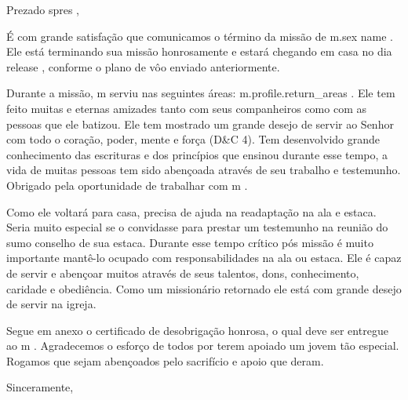 \documentclass[12pt]{letter}
\begin{document}
\begin{letter}{Prezado {{ spres }},}

\date{ {{ date }} }
\opening{}

É com grande satisfação que comunicamos o término da missão de {{ m.sex }} {{ name }}. Ele está terminando sua missão honrosamente e estará chegando em casa no dia {{ release }}, conforme o plano de vôo enviado anteriormente.

Durante a missão, {{ m }} serviu nas seguintes áreas: {{ m.profile.return_areas }}. Ele tem feito muitas e eternas amizades tanto com seus companheiros como com as pessoas que ele batizou. Ele tem mostrado um grande desejo de servir ao Senhor com todo o coração, poder, mente e força (D\&C 4). Tem desenvolvido grande conhecimento das escrituras e dos princípios que ensinou durante esse tempo, a vida de muitas pessoas tem sido abençoada através de seu trabalho e testemunho. Obrigado pela oportunidade de trabalhar com {{ m }}.

Como ele voltará para casa, precisa de ajuda na readaptação na ala e estaca. Seria muito especial se o convidasse para prestar um testemunho na reunião do sumo conselho de sua estaca. Durante esse tempo crítico pós missão é muito importante mantê-lo ocupado com responsabilidades na ala ou estaca. Ele é capaz de servir e abençoar muitos através de seus talentos, dons, conhecimento, caridade e obediência. Como um missionário retornado ele está com grande desejo de servir na igreja.

Segue em anexo o certificado de desobrigação honrosa, o qual deve ser entregue ao {{ m }}. Agradecemos o esforço de todos por terem apoiado um jovem tão especial. Rogamos que sejam abençoados pelo sacrifício e apoio que deram.

\closing{Sinceramente,}
\end{letter}
\end{document}
